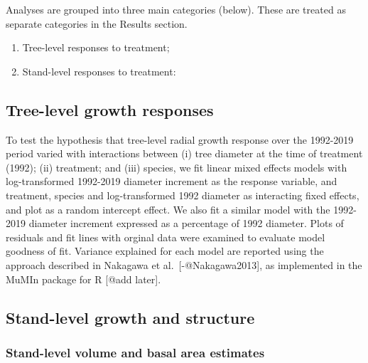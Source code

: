 \documentclass[
]{article}
\providecommand{\tightlist}{%
  \setlength{\itemsep}{0pt}\setlength{\parskip}{0pt}}
\begin{document}
Analyses are grouped into three main categories (below). These are treated as separate categories in the Results section.

\begin{enumerate}
\def\labelenumi{\arabic{enumi}.}
\tightlist
\item
  Tree-level responses to treatment;
\item
  Stand-level responses to treatment:
\end{enumerate}

\hypertarget{tree-level-growth-responses}{%
\subsection{Tree-level growth responses}\label{tree-level-growth-responses}}

To test the hypothesis that tree-level radial growth response over the 1992-2019 period varied with interactions between (i) tree diameter at the time of treatment (1992); (ii) treatment; and (iii) species, we fit linear mixed effects models with log-transformed 1992-2019 diameter increment as the response variable, and treatment, species and log-transformed 1992 diameter as interacting fixed effects, and plot as a random intercept effect. We also fit a similar model with the 1992-2019 diameter increment expressed as a percentage of 1992 diameter. Plots of residuals and fit lines with orginal data were examined to evaluate model goodness of fit. Variance explained for each model are reported using the approach described in Nakagawa et al.~{[}-@Nakagawa2013{]}, as implemented in the MuMIn package for R {[}@add later{]}.

\hypertarget{stand-level-growth-and-structure}{%
\subsection{Stand-level growth and structure}\label{stand-level-growth-and-structure}}

\hypertarget{stand-level-volume-and-basal-area-estimates}{%
\subsubsection{Stand-level volume and basal area estimates}\label{stand-level-volume-and-basal-area-estimates}}
\end{document}
